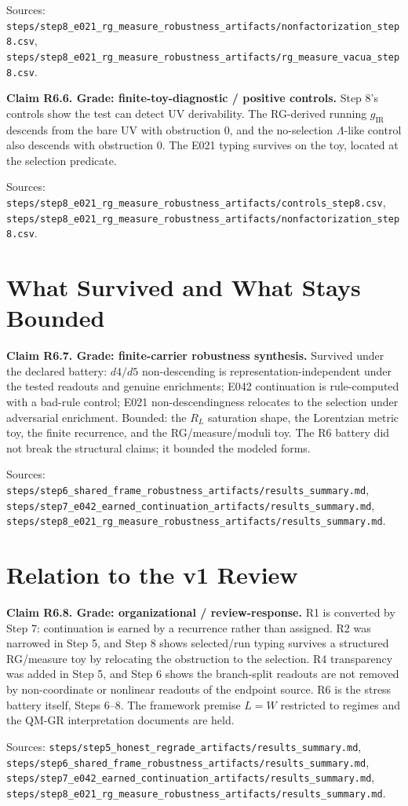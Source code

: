 \documentclass[11pt]{article}
\begin{document}
Sources: \texttt{steps/step8\_e021\_rg\_measure\_robustness\_artifacts/nonfactorization\_step8.csv}, \texttt{steps/step8\_e021\_rg\_measure\_robustness\_artifacts/rg\_measure\_vacua\_step8.csv}.

\textbf{Claim R6.6. Grade: finite-toy-diagnostic / positive controls.}
Step 8's controls show the test can detect UV derivability. The RG-derived running \(g_{\mathrm{IR}}\) descends from the bare UV with obstruction \(0\), and the no-selection \(\Lambda\)-like control also descends with obstruction \(0\). The E021 typing survives on the toy, located at the selection predicate.

Sources: \texttt{steps/step8\_e021\_rg\_measure\_robustness\_artifacts/controls\_step8.csv}, \texttt{steps/step8\_e021\_rg\_measure\_robustness\_artifacts/nonfactorization\_step8.csv}.

\section{What Survived and What Stays Bounded}

\textbf{Claim R6.7. Grade: finite-carrier robustness synthesis.}
Survived under the declared battery: \(d4/d5\) non-descending is representation-independent under the tested readouts and genuine enrichments; E042 continuation is rule-computed with a bad-rule control; E021 non-descendingness relocates to the selection under adversarial enrichment. Bounded: the \(R_L\) saturation shape, the Lorentzian metric toy, the finite recurrence, and the RG/measure/moduli toy. The R6 battery did not break the structural claims; it bounded the modeled forms.

Sources: \texttt{steps/step6\_shared\_frame\_robustness\_artifacts/results\_summary.md}, \texttt{steps/step7\_e042\_earned\_continuation\_artifacts/results\_summary.md}, \texttt{steps/step8\_e021\_rg\_measure\_robustness\_artifacts/results\_summary.md}.

\section{Relation to the v1 Review}

\textbf{Claim R6.8. Grade: organizational / review-response.}
R1 is converted by Step 7: continuation is earned by a recurrence rather than assigned. R2 was narrowed in Step 5, and Step 8 shows selected/run typing survives a structured RG/measure toy by relocating the obstruction to the selection. R4 transparency was added in Step 5, and Step 6 shows the branch-split readouts are not removed by non-coordinate or nonlinear readouts of the endpoint source. R6 is the stress battery itself, Steps 6--8. The framework premise \(L=W\) restricted to regimes and the QM-GR interpretation documents are held.

Sources: \texttt{steps/step5\_honest\_regrade\_artifacts/results\_summary.md}, \texttt{steps/step6\_shared\_frame\_robustness\_artifacts/results\_summary.md}, \texttt{steps/step7\_e042\_earned\_continuation\_artifacts/results\_summary.md}, \texttt{steps/step8\_e021\_rg\_measure\_robustness\_artifacts/results\_summary.md}.
\end{document}
